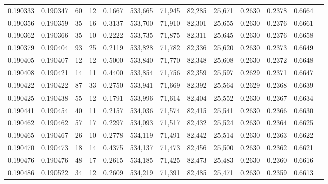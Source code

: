 \begin{tabular}{rrrrrrrrrrrrr}
0.190333 & 0.190347 &    60 &  12 &                                     0.1667 & 533,665 &  71,945 &  82,285 &  25,671 & 0.2630 & 0.2378 & 0.6664 \\
0.190356 & 0.190359 &    35 &  16 &                                     0.3137 & 533,700 &  71,910 &  82,301 &  25,655 & 0.2630 & 0.2376 & 0.6661 \\
0.190362 & 0.190366 &    35 &  10 &                                     0.2222 & 533,735 &  71,875 &  82,311 &  25,645 & 0.2630 & 0.2376 & 0.6658 \\
0.190379 & 0.190404 &    93 &  25 &                                     0.2119 & 533,828 &  71,782 &  82,336 &  25,620 & 0.2630 & 0.2373 & 0.6649 \\
0.190405 & 0.190407 &    12 &  12 &                                     0.5000 & 533,840 &  71,770 &  82,348 &  25,608 & 0.2630 & 0.2372 & 0.6648 \\
0.190408 & 0.190421 &    14 &  11 &                                     0.4400 & 533,854 &  71,756 &  82,359 &  25,597 & 0.2629 & 0.2371 & 0.6647 \\
0.190422 & 0.190422 &    87 &  33 &                                     0.2750 & 533,941 &  71,669 &  82,392 &  25,564 & 0.2629 & 0.2368 & 0.6639 \\
0.190425 & 0.190438 &    55 &  12 &                                     0.1791 & 533,996 &  71,614 &  82,404 &  25,552 & 0.2630 & 0.2367 & 0.6634 \\
0.190441 & 0.190454 &    40 &  11 &                                     0.2157 & 534,036 &  71,574 &  82,415 &  25,541 & 0.2630 & 0.2366 & 0.6630 \\
0.190462 & 0.190462 &    57 &  17 &                                     0.2297 & 534,093 &  71,517 &  82,432 &  25,524 & 0.2630 & 0.2364 & 0.6625 \\
0.190465 & 0.190467 &    26 &  10 &                                     0.2778 & 534,119 &  71,491 &  82,442 &  25,514 & 0.2630 & 0.2363 & 0.6622 \\
0.190470 & 0.190473 &    18 &  14 &                                     0.4375 & 534,137 &  71,473 &  82,456 &  25,500 & 0.2630 & 0.2362 & 0.6621 \\
0.190476 & 0.190476 &    48 &  17 &                                     0.2615 & 534,185 &  71,425 &  82,473 &  25,483 & 0.2630 & 0.2360 & 0.6616 \\
0.190486 & 0.190522 &    34 &  12 &                                     0.2609 & 534,219 &  71,391 &  82,485 &  25,471 & 0.2630 & 0.2359 & 0.6613 \\

\end{tabular}
